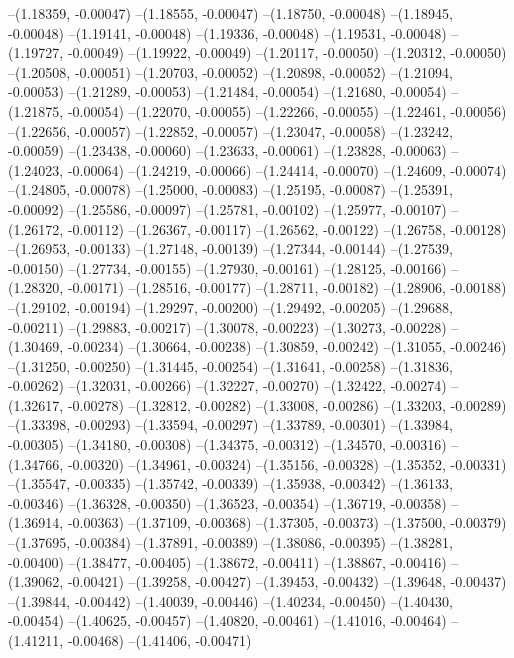 --(1.18359, -0.00047)
--(1.18555, -0.00047)
--(1.18750, -0.00048)
--(1.18945, -0.00048)
--(1.19141, -0.00048)
--(1.19336, -0.00048)
--(1.19531, -0.00048)
--(1.19727, -0.00049)
--(1.19922, -0.00049)
--(1.20117, -0.00050)
--(1.20312, -0.00050)
--(1.20508, -0.00051)
--(1.20703, -0.00052)
--(1.20898, -0.00052)
--(1.21094, -0.00053)
--(1.21289, -0.00053)
--(1.21484, -0.00054)
--(1.21680, -0.00054)
--(1.21875, -0.00054)
--(1.22070, -0.00055)
--(1.22266, -0.00055)
--(1.22461, -0.00056)
--(1.22656, -0.00057)
--(1.22852, -0.00057)
--(1.23047, -0.00058)
--(1.23242, -0.00059)
--(1.23438, -0.00060)
--(1.23633, -0.00061)
--(1.23828, -0.00063)
--(1.24023, -0.00064)
--(1.24219, -0.00066)
--(1.24414, -0.00070)
--(1.24609, -0.00074)
--(1.24805, -0.00078)
--(1.25000, -0.00083)
--(1.25195, -0.00087)
--(1.25391, -0.00092)
--(1.25586, -0.00097)
--(1.25781, -0.00102)
--(1.25977, -0.00107)
--(1.26172, -0.00112)
--(1.26367, -0.00117)
--(1.26562, -0.00122)
--(1.26758, -0.00128)
--(1.26953, -0.00133)
--(1.27148, -0.00139)
--(1.27344, -0.00144)
--(1.27539, -0.00150)
--(1.27734, -0.00155)
--(1.27930, -0.00161)
--(1.28125, -0.00166)
--(1.28320, -0.00171)
--(1.28516, -0.00177)
--(1.28711, -0.00182)
--(1.28906, -0.00188)
--(1.29102, -0.00194)
--(1.29297, -0.00200)
--(1.29492, -0.00205)
--(1.29688, -0.00211)
--(1.29883, -0.00217)
--(1.30078, -0.00223)
--(1.30273, -0.00228)
--(1.30469, -0.00234)
--(1.30664, -0.00238)
--(1.30859, -0.00242)
--(1.31055, -0.00246)
--(1.31250, -0.00250)
--(1.31445, -0.00254)
--(1.31641, -0.00258)
--(1.31836, -0.00262)
--(1.32031, -0.00266)
--(1.32227, -0.00270)
--(1.32422, -0.00274)
--(1.32617, -0.00278)
--(1.32812, -0.00282)
--(1.33008, -0.00286)
--(1.33203, -0.00289)
--(1.33398, -0.00293)
--(1.33594, -0.00297)
--(1.33789, -0.00301)
--(1.33984, -0.00305)
--(1.34180, -0.00308)
--(1.34375, -0.00312)
--(1.34570, -0.00316)
--(1.34766, -0.00320)
--(1.34961, -0.00324)
--(1.35156, -0.00328)
--(1.35352, -0.00331)
--(1.35547, -0.00335)
--(1.35742, -0.00339)
--(1.35938, -0.00342)
--(1.36133, -0.00346)
--(1.36328, -0.00350)
--(1.36523, -0.00354)
--(1.36719, -0.00358)
--(1.36914, -0.00363)
--(1.37109, -0.00368)
--(1.37305, -0.00373)
--(1.37500, -0.00379)
--(1.37695, -0.00384)
--(1.37891, -0.00389)
--(1.38086, -0.00395)
--(1.38281, -0.00400)
--(1.38477, -0.00405)
--(1.38672, -0.00411)
--(1.38867, -0.00416)
--(1.39062, -0.00421)
--(1.39258, -0.00427)
--(1.39453, -0.00432)
--(1.39648, -0.00437)
--(1.39844, -0.00442)
--(1.40039, -0.00446)
--(1.40234, -0.00450)
--(1.40430, -0.00454)
--(1.40625, -0.00457)
--(1.40820, -0.00461)
--(1.41016, -0.00464)
--(1.41211, -0.00468)
--(1.41406, -0.00471)
